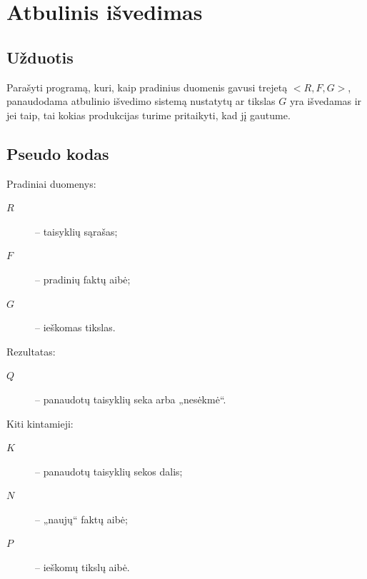 \chapter{Atbulinis išvedimas}

\section{Užduotis}

Parašyti programą, kuri, kaip pradinius duomenis gavusi trejetą
$<R, F, G>$, panaudodama atbulinio išvedimo sistemą nustatytų
ar tikslas $G$ yra išvedamas ir jei taip, tai kokias produkcijas
turime pritaikyti, kad jį gautume.

\section{Pseudo kodas}

\label{sec:bc:pseudo}

Pradiniai duomenys:
\begin{description}
  \item[$R$] – taisyklių sąrašas;
  \item[$F$] – pradinių faktų aibė;
  \item[$G$] – ieškomas tikslas.
\end{description}

Rezultatas:
\begin{description}
  \item[$Q$] – panaudotų taisyklių seka arba „nesėkmė“.
\end{description}

Kiti kintamieji:
\begin{description}
  \item[$K$] – panaudotų taisyklių sekos dalis;
  \item[$N$] – „naujų“ faktų aibė;
  \item[$P$] – ieškomų tikslų aibė.
\end{description}

